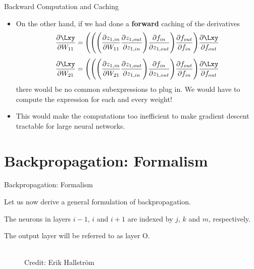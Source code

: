 \begin{frame} {Backward Computation and Caching}
  \begin{itemize}
    \item On the other hand, if we had done a \textbf{forward} caching of the derivatives
    {\small $$\frac{\partial \Lxy}{\partial W_{11}} = \Bigg(\Bigg(\Bigg( \frac{\partial z_{1,in}}{\partial W_{11}} \frac{\partial z_{1,out}}{\partial z_{1,in}} \Bigg)  \frac{\partial f_{in}}{\partial z_{1,out}} \Bigg) \frac{\partial f_{out}}{\partial f_{in}} \Bigg) \frac{\partial \Lxy}{\partial f_{out}}$$}
      {\small $$\frac{\partial \Lxy}{\partial W_{21}} = 
        \Bigg(\Bigg(\Bigg( \frac{\partial z_{1,in}}{\partial W_{21}} \frac{\partial z_{1,out}}{\partial z_{1,in}} \Bigg)  \frac{\partial f_{in}}{\partial z_{1,out}} \Bigg) \frac{\partial f_{out}}{\partial f_{in}} \Bigg) \frac{\partial \Lxy}{\partial f_{out}}$$}
      there would be no common subexpressions to plug in. We would have to compute the  expression for each and every weight!
    \item This would make the computations too inefficient to make gradient descent tractable for large neural networks.
  \end{itemize}
\end{frame}


\section{Backpropagation: Formalism}


\begin{frame} {Backpropagation: Formalism}
  \begin{itemize}
    \item \small{Let us now derive a general formulation of backpropagation.}
    \item \small{The neurons in layers $i-1$, $i$ and $i+1$ are indexed by $j$, $k$ and $m$, respectively.
    \item The output layer will be referred to as layer O.}
   \begin{figure}
    \centering
      \tiny{\\Credit: Erik Hallstr\"{o}m}
    \end{figure}
  \end{itemize}
\end{frame}




